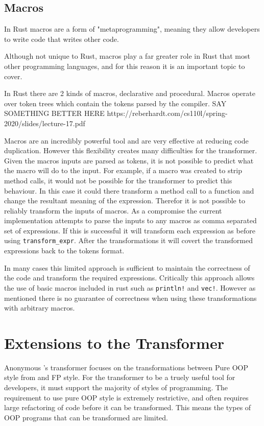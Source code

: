 \documentclass[ oneside,%
                    author={James Elgar},
                    degree={MEng},
                     title={Bidirectional transformer between functional and \\ object-oriented programming in Rust},
                  subtitle={}]{dissertation}
\newcommand{\weixin}{Anonymous }
\newcommand{\rust}[1]{\texttt{#1}}
\begin{document}
\section{Macros}

In Rust macros are a form of "metaprogramming", meaning they allow developers to write code that writes other code. 

Although not unique to Rust, macros play a far greater role in Rust that most other programming languages, and for this reason it is an important topic to cover. 

In Rust there are 2 kinds of macros, declarative and procedural. Macros operate over token trees which contain the tokens parsed by the compiler. SAY SOMETHING BETTER HERE  https://reberhardt.com/cs110l/spring-2020/slides/lecture-17.pdf

Macros are an incredibly powerful tool and are very effective at reducing code duplication. However this flexibility creates many difficulties for the transformer. Given the macros inputs are parsed as tokens, it is not possible to predict what the macro will do to the input. For example, if a macro was created to strip method calls, it would not be possible for the transformer to predict this behaviour. In this case it could there transform a method call to a function and change the resultant meaning of the expression. 
Therefor it is not possible to reliably transform the inputs of macros. As a compromise the current implementation attempts to parse the inputs to any macros as comma separated set of expressions. If this is successful it will transform each expression as before using \verb|transform_expr|. After the transformations it will covert the transformed expressions back to the tokens format.

In many cases this limited approach is sufficient to maintain the correctness of the code and transform the required expressions. Critically this approach allows the use of basic macros included in rust such as \rust{println!} and \rust{vec!}. However as mentioned there is no guarantee of correctness when using these transformations with arbitrary macros.

\chapter{Extensions to the Transformer}

\weixin's transformer focuses on the transformations between Pure OOP style from \cite{cook} and FP style. For the transformer to be a truely useful tool for developers, it must support the majority of styles of programming. 
The requirement to use pure OOP style is extremely restrictive, and often requires large refactoring of code before it can be transformed.
This means the types of OOP programs that can be transformed are limited.
\end{document}
